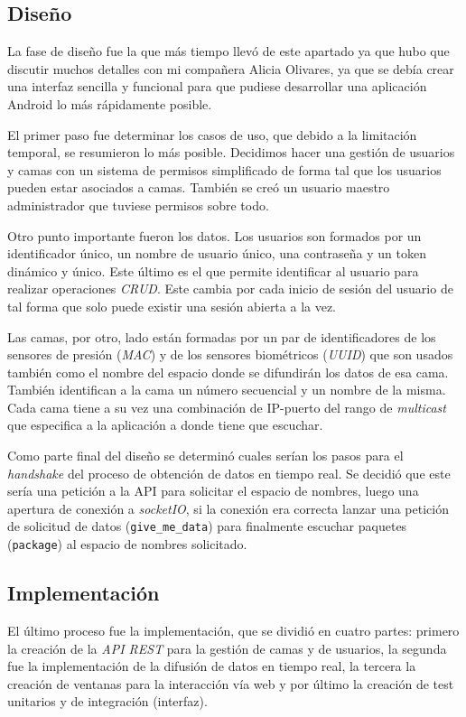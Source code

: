 \subsection{Diseño}
La fase de diseño fue la que más tiempo llevó de este apartado ya que hubo que discutir muchos detalles con mi compañera Alicia Olivares, ya que se debía crear una interfaz sencilla y funcional para que pudiese desarrollar una aplicación Android lo más rápidamente posible.

El primer paso fue determinar los casos de uso, que debido a la limitación temporal, se resumieron lo más posible. Decidimos hacer una gestión de usuarios y camas con un sistema de permisos simplificado de forma tal que los usuarios pueden estar asociados a camas. También se creó un usuario maestro administrador que tuviese permisos sobre todo.

Otro punto importante fueron los datos. Los usuarios son formados por un identificador único, un nombre de usuario único, una contraseña y un token dinámico y único. Este último es el que permite identificar al usuario para realizar operaciones \textit{CRUD}. Este cambia por cada inicio de sesión del usuario de tal forma que solo puede existir una sesión abierta a la vez.

Las camas, por otro, lado están formadas por un par de identificadores de los sensores de presión (\textit{MAC}) y de los sensores biométricos (\textit{UUID}) que son usados también como el nombre del espacio donde se difundirán los datos de esa cama. También identifican a la cama un número secuencial y un nombre de la misma. Cada cama tiene a su vez una combinación de IP-puerto del rango de \textit{multicast} que especifica a la aplicación a donde tiene que escuchar. 

Como parte final del diseño se determinó cuales serían los pasos para el \textit{handshake} del proceso de obtención de datos en tiempo real. Se decidió que este sería una petición a la API para solicitar el espacio de nombres, luego una apertura de conexión a \textit{socketIO}, si la conexión era correcta lanzar una petición de solicitud de datos (\texttt{give\_me\_data}) para finalmente escuchar paquetes (\texttt{package}) al espacio de nombres solicitado.

\subsection{Implementación}
El último proceso fue la implementación, que se dividió en cuatro partes: primero la creación de la \textit{API REST} para la gestión de camas y de usuarios, la segunda fue la implementación de la difusión de datos en tiempo real, la tercera la creación de ventanas para la interacción vía web y por último la creación de test unitarios y de integración (interfaz).


